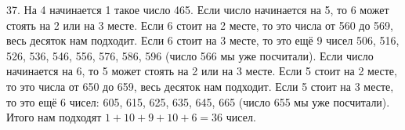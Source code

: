 37. На 4 начинается 1 такое число 465. Если число начинается на 5, то 6 может стоять на 2 или на 3 месте. Если 6 стоит на 2 месте, то это числа от 560 до 569, весь десяток нам подходит. Если 6 стоит на 3 месте, то это ещё 9 чисел 506, 516, 526, 536, 546, 556, 576, 586, 596 (число 566 мы уже посчитали). Если число начинается на 6, то 5 может стоять на 2 или на 3 месте. Если 5 стоит на 2 месте, то это числа от 650 до 659, весь десяток нам подходит. Если 5 стоит на 3 месте, то это ещё 6 чисел: 605, 615, 625, 635, 645, 665 (число 655 мы уже посчитали). Итого нам подходят $1+10+9+10+6=36$ чисел.\\
